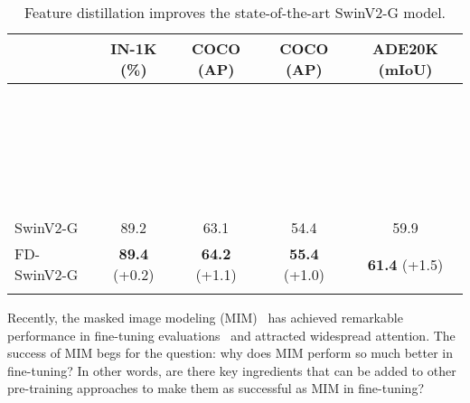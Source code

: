\documentclass{article}
\begin{document}
\begin{table}[t]
\caption{Feature distillation improves the state-of-the-art SwinV2-G model.}
\centering
  \begin{tabular}{l|c|c|c|c}
\Xhline{1.0pt}
  \multirow{1}{*}{Method} &  \multirow{1}{*}{IN-1K (\%)} & \multirow{1}{*}{COCO (AP)} & \multirow{1}{*}{COCO (AP)} & \multirow{1}{*}{ADE20K (mIoU)} \\
  \hline
  \color{gray}{GLIPv2-CoSwin-H}~\cite{GLIPv2_2022} & \color{gray}{-} & \color{gray}{62.4} & \color{gray}{-} & \color{gray}{-} \\
  \color{gray}{Florence-CoSwin-H}~\cite{yuan2021florence} & \color{gray}{-} & \color{gray}{62.4} & \color{gray}{-} & \color{gray}{-}  \\
  \color{gray}{DINO-Swin-L}~\cite{zhang2022dino} & \color{gray}{-} & \color{gray}{63.3} & \color{gray}{-} & \color{gray}{-} \\
  \color{gray}{MaskDINO-Swin-L}~\cite{li2022mask} & \color{gray}{-} & \color{gray}{-} & \color{gray}{54.7} & \color{gray}{60.8} \\
  \color{gray}{ViT-Adapter-L}~\cite{chen2022vitadapter} & \color{gray}{-} & \color{gray}{-} & \color{gray}{-} & \color{gray}{60.5} \\
    \hline
  \hline
  SwinV2-G~\cite{swinv2} & 89.2 & 63.1 & 54.4 & 59.9 \\
  FD-SwinV2-G & \textbf{89.4}\scriptsize{ (+0.2)} & \textbf{64.2}\scriptsize{ (+1.1)} & \textbf{55.4}\scriptsize{ (+1.0)} & \textbf{61.4}\scriptsize{ (+1.5)} \\
\Xhline{1.0pt}
  \end{tabular}
\label{tab:FD_swinv2_G}
\end{table}
Recently, the masked image modeling (MIM)~\cite{chen2020imagegpt,bao2021beit,xie2021simmim,MaskedAutoencoders2021} has achieved remarkable performance in fine-tuning evaluations~\cite{bao2021beit,xie2021simmim,MaskedAutoencoders2021} and attracted widespread attention. The success of MIM begs for the question: why does MIM perform so much better in fine-tuning? In other words, are there key ingredients that can be added to other pre-training approaches to make them as successful as MIM in fine-tuning? 
\end{document}
